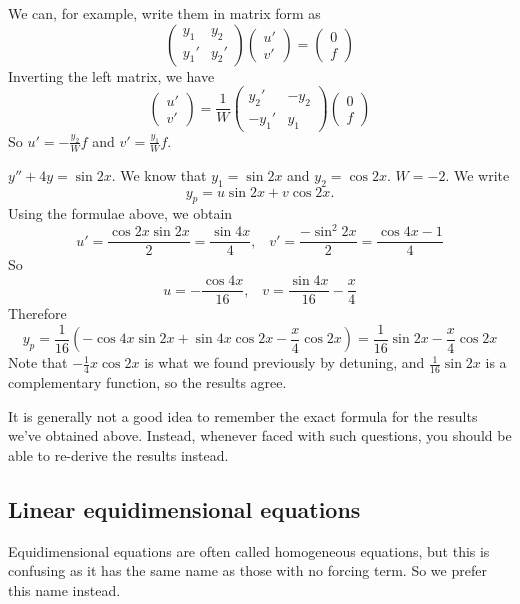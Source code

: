\documentclass[a4paper]{article}
\begin{document}
We can, for example, write them in matrix form as
\[
  \begin{pmatrix}
    y_1 & y_2\\
    y_1' & y_2'
  \end{pmatrix}
  \begin{pmatrix}
    u'\\
    v'
  \end{pmatrix}
  =
  \begin{pmatrix}
    0\\
    f
  \end{pmatrix}
\]
Inverting the left matrix, we have
\[
  \begin{pmatrix}
    u'\\
    v'
  \end{pmatrix} = \frac{1}{W}
  \begin{pmatrix}
    y_2' & -y_2\\
    -y_1' & y_1
  \end{pmatrix}
  \begin{pmatrix}
    0\\f
  \end{pmatrix}
\]
So $u' = -\frac{y_2}{W}f$ and $v' = \frac{y_1}{W}f$.

\begin{eg}
  $y'' + 4y = \sin 2x$. We know that $y_1 = \sin 2x$ and $y_2 = \cos 2x$. $W = -2$. We write
  \[
    y_p = u\sin 2x + v\cos 2x.
  \]
  Using the formulae above, we obtain
  \[
    u' = \frac{\cos 2x\sin 2x}{2} = \frac{\sin 4x}{4},\;\;\; v' = \frac{-\sin^2 2x}{2} = \frac{\cos 4x - 1}{4}
  \]
  So
  \[
    u = -\frac{\cos 4x}{16}, \;\;\; v = \frac{\sin 4x}{16} - \frac{x}{4}
  \]
  Therefore
  \[
    y_p = \frac{1}{16}(-\cos 4x\sin 2x + \sin 4x\cos 2x - \frac{x}{4}\cos 2x) = \frac{1}{16}\sin 2x - \frac{x}{4}\cos 2x
  \]
  Note that $-\frac{1}{4}x\cos 2x$ is what we found previously by detuning, and $\frac{1}{16}\sin 2x$ is a complementary function, so the results agree.
\end{eg}

It is generally not a good idea to remember the exact formula for the results we've obtained above. Instead, whenever faced with such questions, you should be able to re-derive the results instead.

\subsection{Linear equidimensional equations}
Equidimensional equations are often called homogeneous equations, but this is confusing as it has the same name as those with no forcing term. So we prefer this name instead.
\end{document}
